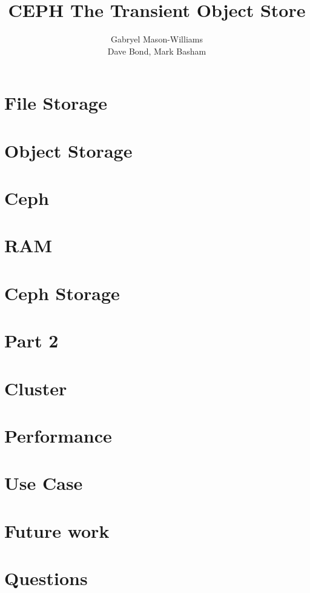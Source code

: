 \documentclass[notes,11pt]{beamer}
\title[RAM Based CEPH]{CEPH The Transient Object Store}
\author[me]{Gabryel Mason-Williams\\[3mm] Dave Bond, Mark Basham}
\begin{document}




\section{File Storage}

\section{Object Storage}

\section{Ceph} 

\section{RAM}

\section{Ceph Storage}

\section{Part 2}

\section{Cluster}

\section{Performance}

\section{Use Case}

\section{Future work}

\section{Questions}

\end{document}
